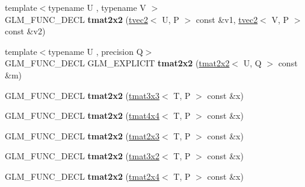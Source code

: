 \begin{DoxyCompactItemize}
\item 
\hypertarget{structglm_1_1tmat2x2_ab910eb77d8f50dfa02ad062bb429e0a5}{{\footnotesize template$<$typename U , typename V $>$ }\\G\-L\-M\-\_\-\-F\-U\-N\-C\-\_\-\-D\-E\-C\-L {\bfseries tmat2x2} (\hyperlink{structglm_1_1tvec2}{tvec2}$<$ U, P $>$ const \&v1, \hyperlink{structglm_1_1tvec2}{tvec2}$<$ V, P $>$ const \&v2)}\label{structglm_1_1tmat2x2_ab910eb77d8f50dfa02ad062bb429e0a5}

\item 
\hypertarget{structglm_1_1tmat2x2_add527359c118148fb8984d4868e0dc7f}{{\footnotesize template$<$typename U , precision Q$>$ }\\G\-L\-M\-\_\-\-F\-U\-N\-C\-\_\-\-D\-E\-C\-L G\-L\-M\-\_\-\-E\-X\-P\-L\-I\-C\-I\-T {\bfseries tmat2x2} (\hyperlink{structglm_1_1tmat2x2}{tmat2x2}$<$ U, Q $>$ const \&m)}\label{structglm_1_1tmat2x2_add527359c118148fb8984d4868e0dc7f}

\item 
\hypertarget{structglm_1_1tmat2x2_abc0c5446896598d24f4b9e88f9d23f3d}{G\-L\-M\-\_\-\-F\-U\-N\-C\-\_\-\-D\-E\-C\-L {\bfseries tmat2x2} (\hyperlink{structglm_1_1tmat3x3}{tmat3x3}$<$ T, P $>$ const \&x)}\label{structglm_1_1tmat2x2_abc0c5446896598d24f4b9e88f9d23f3d}

\item 
\hypertarget{structglm_1_1tmat2x2_ade16e93e5a964794a321a8b9ecf80559}{G\-L\-M\-\_\-\-F\-U\-N\-C\-\_\-\-D\-E\-C\-L {\bfseries tmat2x2} (\hyperlink{structglm_1_1tmat4x4}{tmat4x4}$<$ T, P $>$ const \&x)}\label{structglm_1_1tmat2x2_ade16e93e5a964794a321a8b9ecf80559}

\item 
\hypertarget{structglm_1_1tmat2x2_ad28285e6d69b3365e73b54a65b0546c8}{G\-L\-M\-\_\-\-F\-U\-N\-C\-\_\-\-D\-E\-C\-L {\bfseries tmat2x2} (\hyperlink{structglm_1_1tmat2x3}{tmat2x3}$<$ T, P $>$ const \&x)}\label{structglm_1_1tmat2x2_ad28285e6d69b3365e73b54a65b0546c8}

\item 
\hypertarget{structglm_1_1tmat2x2_adf92e17f328eb77f42d1c27e8928b318}{G\-L\-M\-\_\-\-F\-U\-N\-C\-\_\-\-D\-E\-C\-L {\bfseries tmat2x2} (\hyperlink{structglm_1_1tmat3x2}{tmat3x2}$<$ T, P $>$ const \&x)}\label{structglm_1_1tmat2x2_adf92e17f328eb77f42d1c27e8928b318}

\item 
\hypertarget{structglm_1_1tmat2x2_a9f49cfb77f0ff173eb99c26740f0ea2a}{G\-L\-M\-\_\-\-F\-U\-N\-C\-\_\-\-D\-E\-C\-L {\bfseries tmat2x2} (\hyperlink{structglm_1_1tmat2x4}{tmat2x4}$<$ T, P $>$ const \&x)}\label{structglm_1_1tmat2x2_a9f49cfb77f0ff173eb99c26740f0ea2a}


\end{DoxyCompactItemize}
